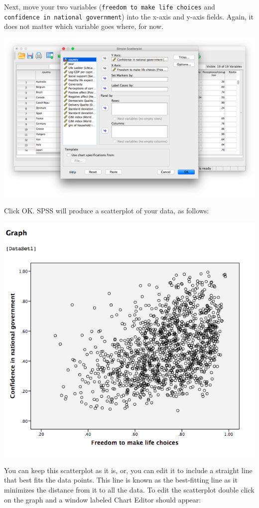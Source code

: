 \documentclass[
]{book}
\begin{document}
Next, move your two variables (\texttt{freedom\ to\ make\ life\ choices} and \texttt{confidence\ in\ national\ government}) into the x-axis and y-axis fields. Again, it does not matter which variable goes where, for now.

\includegraphics{img/3.4.24.png}

Click {OK}. SPSS will produce a scatterplot of your data, as follows:

\includegraphics{img/3.4.25.png}

You can keep this scatterplot as it is, or, you can edit it to include a straight line that best fits the data points. This line is known as the best-fitting line as it minimizes the distance from it to all the data. To edit the scatterplot double click on the graph and a window labeled Chart Editor should appear:
\end{document}
